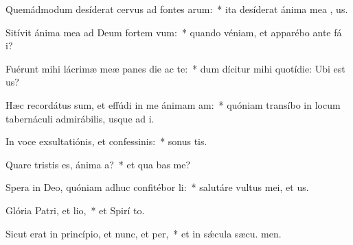 \item Quemádmodum desíderat cervus ad fontes arum:~* ita desíderat ánima mea  , us.
\item Sitívit ánima mea ad Deum fortem vum:~* quando véniam, et apparébo ante fá i?
\item Fuérunt mihi lácrimæ meæ panes die ac te:~* dum dícitur mihi quotídie: Ubi est  us?
\item Hæc recordátus sum, et effúdi in me ánimam am:~* quóniam transíbo in locum tabernáculi admirábilis, usque ad  i.
\item In voce exsultatiónis, et confessinis:~* sonus tis.
\item Quare tristis es, ánima a?~* et qua bas me?
\item Spera in Deo, quóniam adhuc confitébor li:~* salutáre vultus mei, et  us.
\item Glória Patri, et lio,~* et Spirí to.
\item Sicut erat in princípio, et nunc, et per,~* et in sǽcula sæcu. men.
